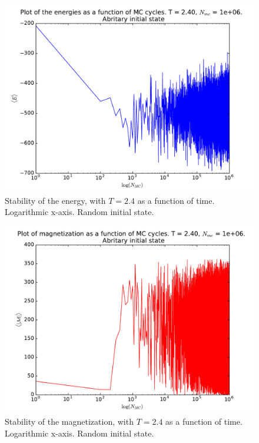 \documentclass[12pt]{article}
\begin{document}
\begin{figure}[H]
\centering
\includegraphics[width=\linewidth]{Plots/Energy_stability_logarithmic_T24.pdf}
\caption{Stability of the energy, with $T = 2.4$ as a function of time. Logarithmic x-axis. Random initial state.}
\label{fig:Energy_stab_log_T2}
\end{figure}
\begin{figure}[H]
\centering
\includegraphics[width=\linewidth]{Plots/Magnetization_stability_logarithmic_T24.pdf}
\caption{Stability of the magnetization, with $T = 2.4$ as a function of time. Logarithmic x-axis. Random initial state.}
\label{fig:Mag_stab_log_T2}
\end{figure}
\end{document}
